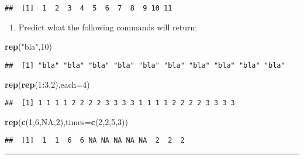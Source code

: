 \documentclass[]{article}
\newenvironment{Shaded}{\begin{snugshade}}{\end{snugshade}}
\newcommand{\KeywordTok}[1]{\textcolor[rgb]{0.13,0.29,0.53}{\textbf{#1}}}
\newcommand{\DataTypeTok}[1]{\textcolor[rgb]{0.13,0.29,0.53}{#1}}
\newcommand{\DecValTok}[1]{\textcolor[rgb]{0.00,0.00,0.81}{#1}}
\newcommand{\StringTok}[1]{\textcolor[rgb]{0.31,0.60,0.02}{#1}}
\newcommand{\OtherTok}[1]{\textcolor[rgb]{0.56,0.35,0.01}{#1}}
\newcommand{\OperatorTok}[1]{\textcolor[rgb]{0.81,0.36,0.00}{\textbf{#1}}}
\newcommand{\NormalTok}[1]{#1}
\providecommand{\tightlist}{%
  \setlength{\itemsep}{0pt}\setlength{\parskip}{0pt}}
\begin{document}
\begin{verbatim}
##  [1]  1  2  3  4  5  6  7  8  9 10 11
\end{verbatim}

\begin{enumerate}
\def\labelenumi{\arabic{enumi}.}
\setcounter{enumi}{4}
\tightlist
\item
  Predict what the following commands will return:
\end{enumerate}

\begin{Shaded}
\begin{Highlighting}[]
\KeywordTok{rep}\NormalTok{(}\StringTok{"bla"}\NormalTok{,}\DecValTok{10}\NormalTok{)}
\end{Highlighting}
\end{Shaded}

\begin{verbatim}
##  [1] "bla" "bla" "bla" "bla" "bla" "bla" "bla" "bla" "bla" "bla"
\end{verbatim}

\begin{Shaded}
\begin{Highlighting}[]
\KeywordTok{rep}\NormalTok{(}\KeywordTok{rep}\NormalTok{(}\DecValTok{1}\OperatorTok{:}\DecValTok{3}\NormalTok{,}\DecValTok{2}\NormalTok{),}\DataTypeTok{each=}\DecValTok{4}\NormalTok{)}
\end{Highlighting}
\end{Shaded}

\begin{verbatim}
##  [1] 1 1 1 1 2 2 2 2 3 3 3 3 1 1 1 1 2 2 2 2 3 3 3 3
\end{verbatim}

\begin{Shaded}
\begin{Highlighting}[]
\KeywordTok{rep}\NormalTok{(}\KeywordTok{c}\NormalTok{(}\DecValTok{1}\NormalTok{,}\DecValTok{6}\NormalTok{,}\OtherTok{NA}\NormalTok{,}\DecValTok{2}\NormalTok{),}\DataTypeTok{times=}\KeywordTok{c}\NormalTok{(}\DecValTok{2}\NormalTok{,}\DecValTok{2}\NormalTok{,}\DecValTok{5}\NormalTok{,}\DecValTok{3}\NormalTok{))}
\end{Highlighting}
\end{Shaded}

\begin{verbatim}
##  [1]  1  1  6  6 NA NA NA NA NA  2  2  2
\end{verbatim}

\begin{center}\rule{0.5\linewidth}{\linethickness}\end{center}
\end{document}
